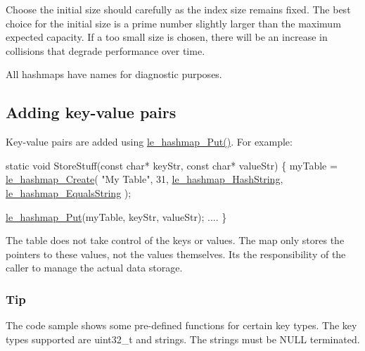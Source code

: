 Choose the initial size should carefully as the index size remains fixed. The best choice for the initial size is a prime number slightly larger than the maximum expected capacity. If a too small size is chosen, there will be an increase in collisions that degrade performance over time.

All hashmaps have names for diagnostic purposes.\hypertarget{c_hashmap_c_hashmap_insert}{}\subsection{Adding key-\/value pairs}\label{c_hashmap_c_hashmap_insert}
Key-\/value pairs are added using \hyperlink{le__hashmap_8h_a68759fb8291c487a507eae6d92710fc7}{le\+\_\+hashmap\+\_\+\+Put()}. For example\+:


\begin{DoxyCode}
\textcolor{keyword}{static} \textcolor{keywordtype}{void} StoreStuff(\textcolor{keyword}{const} \textcolor{keywordtype}{char}* keyStr, \textcolor{keyword}{const} \textcolor{keywordtype}{char}* valueStr)
\{
    myTable = \hyperlink{le__hashmap_8h_ade79896a5b2ceec82c570fe21f7efe3a}{le\_hashmap\_Create}(
                        \textcolor{stringliteral}{"My Table"},
                        31,
                        \hyperlink{le__hashmap_8h_a3ff75de814b38d4c4283379acb406b65}{le\_hashmap\_HashString},
                        \hyperlink{le__hashmap_8h_a63d2b6c0689ece50ce979557029b8483}{le\_hashmap\_EqualsString}
                      );

    \hyperlink{le__hashmap_8h_a68759fb8291c487a507eae6d92710fc7}{le\_hashmap\_Put}(myTable, keyStr, valueStr);
    ....
\}
\end{DoxyCode}


The table does not take control of the keys or values. The map only stores the pointers to these values, not the values themselves. It\textquotesingle{}s the responsibility of the caller to manage the actual data storage.\hypertarget{c_hashmap_c_hashmap_tips}{}\subsubsection{Tip}\label{c_hashmap_c_hashmap_tips}
The code sample shows some pre-\/defined functions for certain key types. The key types supported are uint32\+\_\+t and strings. The strings must be N\+U\+L\+L terminated.


